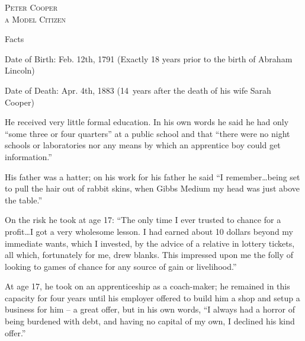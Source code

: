 \documentclass{article}
\begin{document}
\centering
{}
\fontsize{0.8in}{0.6in}\selectfont
\scshape 
{} Peter Cooper \\
 a Model Citizen

\vspace{0.05in}

\fontsize{16pt}{16pt}\selectfont
{}
\justify
Facts

\vspace{0.1in}

\begin{minipage}[t]{0.46\linewidth}
\fontsize{10.7pt}{12.7pt}\selectfont
\raggedright
\upshape
\begin{enumList}

\item Date of Birth: Feb. 12th, 1791 (Exactly 18 years prior to the birth of
{\mdseries Abraham Lincoln})

\item Date of Death: Apr. 4th, 1883 (14~years after the death of his wife
{\mdseries Sarah Cooper})

\item He received {\mdseries very little formal education}. In his own words
he said he had only ``some three or four quarters'' at a public school and
that ``there were no night schools or laboratories nor any means by which an
apprentice boy could get information.''

\item His father was a hatter; on his work for his father he said ``I
remember\ldots being set to pull the hair out of rabbit skins, when {\fontspec
{Gibbs Medium} my head was just above the table}.''

\item On the risk he took at age 17: ``The only time I ever trusted to chance
for a profit\ldots I got a very wholesome lesson. I had earned about 10
dollars beyond my immediate wants, which I invested, by the advice of a
relative in lottery tickets, all which, fortunately for me, drew blanks. This
impressed upon me the {\mdseries folly of looking to games of chance} for any
source of gain or livelihood.''

\item At age 17, he took on an apprenticeship as a coach-maker; he remained in
this capacity for four years until his employer offered to build him a shop
and setup a business for him -- a great offer, but in his own words, ``I
always had a {\mdseries horror of being burdened with debt}, and having no
capital of my own, {\mdseries I declined his kind offer}.''


\end{enumList}
\end{minipage}
\end{document}
